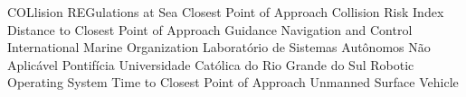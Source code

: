 \begin{acronym}
  {COLlision REGulations at Sea}
      {Closest Point of Approach}
      {Collision Risk Index}
     {Distance to Closest Point of Approach}
      {Guidance Navigation and Control}
      {International Marine Organization}
      {Laboratório de Sistemas Autônomos}
       {Não Aplicável}
    {Pontifícia Universidade Católica do Rio Grande do Sul}
      {Robotic Operating System}
     {Time to Closest Point of Approach}
      {Unmanned Surface Vehicle}
\end{acronym}